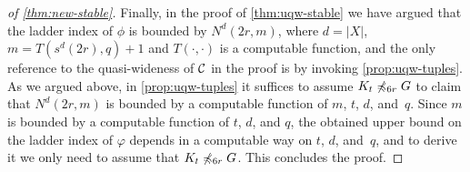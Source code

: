 \begin{proof}[of \cref{thm:new-stable}]
Finally, in the proof of \cref{thm:uqw-stable} we have argued that the ladder index of $\phi$ is bounded by $N^d(2r,m)$, where $d=|X|$, $m=T(s^d(2r),q)+1$
and $T(\cdot,\cdot)$ is a computable function,
and the only reference to the quasi-wideness of $\mathcal{C}$ in the proof
is by invoking \cref{prop:uqw-tuples}.
As we argued above, in \cref{prop:uqw-tuples} it suffices to assume $K_t\not\preccurlyeq_{6r} G$ to claim that $N^d(2r,m)$ is bounded by a computable function of $m$, $t$, $d$, and~$q$.
Since $m$ is bounded by a computable function of $t$, $d$, and $q$, the obtained upper bound on the ladder index of $\varphi$ depends in a computable way on $t$, $d$, and~$q$,
and to derive it we only need to assume that $K_t\not\preccurlyeq_{6r} G$. This concludes the proof.
\end{proof}

\begin{comment}
$N(\cdot,\cdot)$ be the function given by \cref{thm:new-uqw}.
	Following the proof of \cref{prop:uqw-tuples}, we see that for the functions $N^d(r,m)$ and $s^d(r)$, we can take the following functions:%
		\newcommand{\pow}{\ \uparrow\ }%
	\begin{align*}
	 N^d(r,m)&= c\cdot (m d)\pow(2(t+4))\pow(d(t+2r)),\\
	  s^d(r)&= d\cdot t,
	\end{align*}
where $x\pow y$ denotes $x^y$ and associates to the right, i.e., $x\pow y\pow z=x^(y^z)$.
In particular, the proof of \cref{prop:uqw-tuples} shows the following property
($\ast$)
for every graph $G$ such that $K_t\not\minor_{3r+1} G$ 
and for every set of $d$-tuples $A\subset V(G)^d$ of size at least $N^d(r,m)$
there is a subset $B\subset A$ of size $m$ and $S\subset V(G)$ of size at most $s^d(r)$
such that $B$ is mutually $r$-independent in $G-S$.

	
As in the proof of \cref{thm:uqw-stable}, let $r=7^q$,  
$s=s^d(2r)=d\cdot t$,  $T=(s+d)^d\cdot |\mathrm{Tp}_d^{q,s}|$ and $m=T+1$.



Let $\cal C$ be the class of all graphs $G$
such that $K_t\not\minor_{3r+1} G$, i.e., $K_t\not\minor_{3\cdot 7^q+1} G$. We repeat the argument presented in the second paragraph of the proof of \cref{thm:uqw-stable}, and assume that there is a $\phi$-ladder in $G\in \cal C$ of length larger than $N^d(2r,m)$.
 Instead of applying \cref{prop:uqw-tuples} we apply  ($\ast$) above
and obtain sets  $S$ and $B$ with the required properties. As before, this yields a contradiction. 


In particular, every $\phi$-ladder in a graph $G\in \cal C$ has length at most $N^d(2r,m)$, 
which is at most $$c'\cdot (d^{d+1}\cdot (t+1)^d\cdot |\mathrm{Tp}_d^{q,d\cdot t}|)\pow(2t+8)\pow(d\cdot t+2d\cdot 7^q),$$
where $c'$ is some constant.
As the number $|\mathrm{Tp}_d^{q,s}|$ is computable given $d,q,s$, this 
 yields \cref{thm:new-stable}.
\end{proof}
\end{comment}
